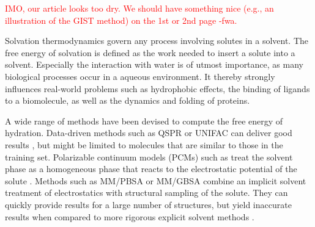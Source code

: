 \documentclass[9pt,tutorial]{livecoms}
\newcommand{\todo}{\textcolor{red}}
\begin{document}
\todo{IMO, our article looks too dry. We should have something nice (e.g., an illustration of the GIST method) on the 1st or 2nd page -fwa.}


Solvation thermodynamics govern any process involving solutes in a solvent.
The free energy of solvation is defined as the work needed to insert a solute into a solvent. Especially the interaction with water is of utmost importance, as many biological processes occur in a aqueous environment. 
It thereby strongly influences real-world problems such as hydrophobic effects, the binding of ligands to a biomolecule, as well as the dynamics and folding of proteins.


A wide range of methods have been devised to compute the free energy of hydration.
Data-driven methods such as QSPR or UNIFAC can deliver good results \cite{Borhani2019-qspr,Fredenslund1975-unifac}, but might be limited to molecules that are similar to those in the training set.
Polarizable continuum models (PCMs) \cite{Miertus1981-pcm,Klamt1993-cosmo} such as treat the solvent phase as a homogeneous phase that reacts to the electrostatic potential of the solute \cite{Mennucci2010-pcm}.
Methods such as MM/PBSA or MM/GBSA \cite{Sitkoff1994-pbsa,Kollman2000-mmpbsa} combine an implicit solvent treatment of electrostatics with structural sampling of the solute.
They can quickly provide results for a large number of structures, but yield inaccurate results when compared to more rigorous explicit solvent methods \cite{Genheden2015-mmpbsa-review}.
\end{document}
